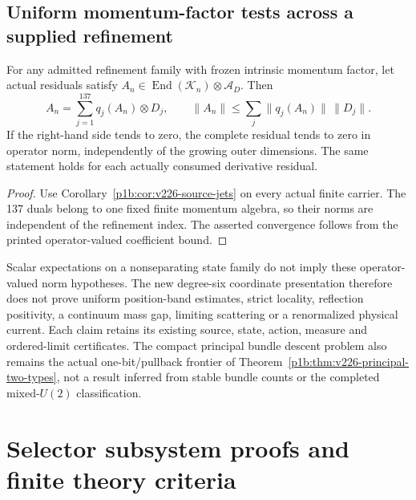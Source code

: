 \documentclass[12pt,a4paper]{article}
\begin{document}
\subsection{Uniform momentum-factor tests across a supplied refinement}
\label{p12:sec:v226-refinement-coefficients}
\begin{proposition}
\label{p12:prop:v226-refinement-coefficients}
For any admitted refinement family with frozen intrinsic momentum factor,
let actual residuals satisfy
$A_n\in\operatorname{End}(\mathcal K_n)\otimes\mathcal A_D$.
Then
\[
 A_n=\sum_{j=1}^{137}q_j(A_n)\otimes D_j,\qquad
 \|A_n\|\le\sum_j\|q_j(A_n)\|\,\|D_j\|.
\]
If the right-hand side tends to zero, the complete residual tends to zero
in operator norm, independently of the growing outer dimensions. The same
statement holds for each actually consumed derivative residual.
\end{proposition}
\begin{proof}
Use Corollary~\ref{p1b:cor:v226-source-jets} on every actual finite carrier.
The 137 duals belong to one fixed finite momentum algebra, so their norms
are independent of the refinement index. The asserted convergence follows
from the printed operator-valued coefficient bound.
\end{proof}
Scalar expectations on a nonseparating state family do not imply these
operator-valued norm hypotheses. The new degree-six coordinate presentation
therefore does not prove uniform position-band estimates, strict locality,
reflection positivity, a continuum mass gap, limiting scattering or a
renormalized physical current. Each claim retains its existing source,
state, action, measure and ordered-limit certificates. The compact principal
bundle descent problem also remains the actual one-bit/pullback frontier
of Theorem~\ref{p1b:thm:v226-principal-two-types}, not a result inferred from
stable bundle counts or the completed mixed-$U(2)$ classification.




\section{Selector subsystem proofs and finite theory criteria}
\label{p13:sec:v237-d6}
\end{document}
